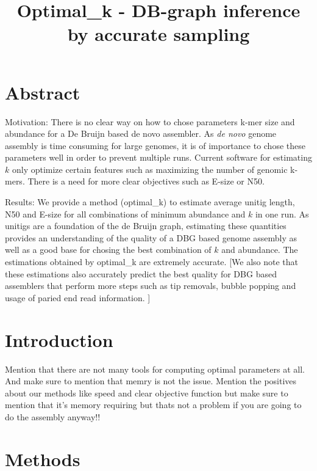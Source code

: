 \documentclass[a4paper,6pt]{article}
\begin{document}
\title{Optimal\_k - DB-graph inference by accurate sampling} 
\author{}
\date{} %
\maketitle

\section{Abstract}
Motivation: There is no clear way on how to chose parameters k-mer size and abundance for a De Bruijn based de novo assembler. As \emph{de novo} genome assembly is time consuming for large genomes, it is of importance to chose these parameters well in order to prevent multiple runs. Current software for estimating $k$ only optimize certain features such as maximizing the number of genomic k-mers. There is a need for more clear objectives such as E-size or N50.

Results:
We provide a method (optimal\_k) to estimate average unitig length, N50 and E-size for all combinations of minimum abundance and $k$ in one run. As unitigs are a foundation of the de Bruijn graph, estimating these quantities provides an understanding of the quality of a DBG based genome assembly as well as a good base for chosing the best combination of $k$ and abundance. The estimations obtained by optimal\_k are extremely accurate. [We also note that these estimations also accurately predict the best quality for DBG based assemblers that perform more steps such as tip removals, bubble popping and usage of paried end read information. ]

\section{Introduction} %
\label{sec:introduction}

{ \color{red} Mention that there are not many tools for computing optimal parameters at all. And make sure to mention that memry is not the issue. Mention the positives about our methods like speed and clear objective function but make sure to mention that it's memory requiring but thats not a problem if you are going to do the assembly anyway!!}

\section{Methods} %
\label{sec:methods}
\end{document}
